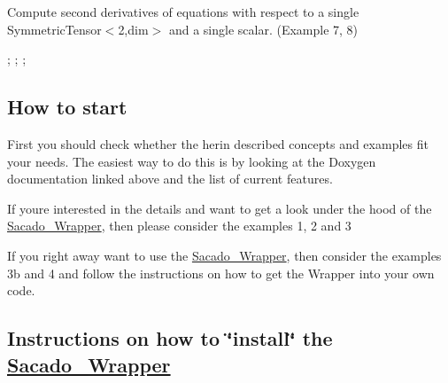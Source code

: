 \href{https://www.codecogs.com/eqnedit.php?latex=\boldsymbol{A,&space;B,&space;}&space;\overset{4}{C}&space;\textrm{&space;and&space;}&space;$D$&space;\textrm{&space;at&space;the&space;same&space;time}}{\tt }


\begin{DoxyItemize}
\item Compute second derivatives of equations with respect to a single Symmetric\+Tensor$<$2,dim$>$ and a single scalar. (Example 7, 8)
\end{DoxyItemize}

\href{https://www.codecogs.com/eqnedit.php?latex=\overset{4}{C}&space;=&space;\frac{\partial^2\Psi}{\partial\boldsymbol{\varepsilon&space;}^2}}{\tt } ; \href{https://www.codecogs.com/eqnedit.php?latex=\boldsymbol{E}&space;=&space;\frac{\partial^2\Psi}{\partial\boldsymbol{\varepsilon&space;}&space;\partial\varphi&space;}}{\tt } ; \href{https://www.codecogs.com/eqnedit.php?latex=\boldsymbol{F}&space;=&space;\frac{\partial^2\Psi}{\partial\varphi&space;\partial\boldsymbol{\varepsilon&space;}&space;}}{\tt } ; \href{https://www.codecogs.com/eqnedit.php?latex=G&space;=&space;\frac{\partial^2\Psi}{\partial\varphi^2&space;}}{\tt }

\subsection*{How to start}


\begin{DoxyItemize}
\item First you should check whether the herin described concepts and examples fit your needs. The easiest way to do this is by looking at the Doxygen documentation linked above and the list of current features.
\item If you\textquotesingle{}re interested in the details and want to get a look under the hood of the \hyperlink{namespaceSacado__Wrapper}{Sacado\+\_\+\+Wrapper}, then please consider the examples 1, 2 and 3
\item If you right away want to use the \hyperlink{namespaceSacado__Wrapper}{Sacado\+\_\+\+Wrapper}, then consider the examples 3b and 4 and follow the instructions on how to get the Wrapper into your own code.
\end{DoxyItemize}

\subsection*{Instructions on how to \char`\"{}install\char`\"{} the \hyperlink{namespaceSacado__Wrapper}{Sacado\+\_\+\+Wrapper}}



